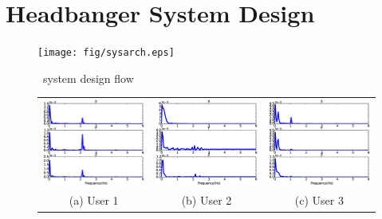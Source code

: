 \section{Headbanger System Design}\label{sec:design}

\begin{figure}[t]
\centering
\texttt{[image: fig/sysarch.eps]}
\caption{\systemname~system design flow}
\label{fig:sysarch}
\end{figure}

\begin{figure}[t]
\begin{center}
\begin{tabular}{ccc}
\includegraphics [width=.33\linewidth]{fig/freq_sub1}&
\includegraphics [width=.33\linewidth]{fig/freq_sub8}&
\includegraphics [width=.33\linewidth]{fig/freq_sub9}\\
(a) User 1& (b) User 2 & (c) User 3 \\
\end{tabular}


\end{center}
\end{figure}
